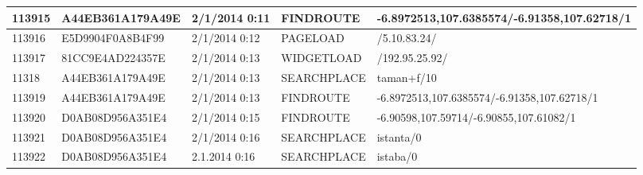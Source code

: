 \begin{longtable}{|p{1cm}|l|l|l|p{8cm}|}
113915         & A44EB361A179A49E & 2/1/2014 0:11            & FINDROUTE       & -6.8972513,107.6385574/-6.91358,107.62718/1                                                                                                                                                                           \\ \hline
113916         & E5D9904F0A8B4F99 & 2/1/2014 0:12            & PAGELOAD        & /5.10.83.24/                                                                                                                                                                                                          \\ \hline
113917         & 81CC9E4AD224357E & 2/1/2014 0:13            & WIDGETLOAD      & /192.95.25.92/                                                                                                                                                                                                        \\ \hline
11318          & A44EB361A179A49E & 2/1/2014 0:13            & SEARCHPLACE     & taman+f/10                                                                                                                                                                                                            \\ \hline
113919         & A44EB361A179A49E & 2/1/2014 0:13            & FINDROUTE       & -6.8972513,107.6385574/-6.91358,107.62718/1                                                                                                                                                                           \\ \hline
113920         & D0AB08D956A351E4 & 2/1/2014 0:15            & FINDROUTE       & -6.90598,107.59714/-6.90855,107.61082/1                                                                                                                                                                               \\ \hline
113921         & D0AB08D956A351E4 & 2/1/2014 0:16            & SEARCHPLACE     & istanta/0                                                                                                                                                                                                             \\ \hline
113922         & D0AB08D956A351E4 & 2.1.2014 0:16            & SEARCHPLACE     & istaba/0                                                                                                                                                                                                              \\ \hline

\end{longtable}
